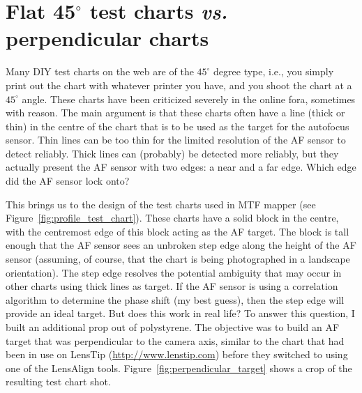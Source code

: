 \documentclass[a4paper]{article}
\begin{document}
\section{Flat 45$^\circ$ test charts \emph{vs.} perpendicular charts}
\label{sec:perpendicular}
Many DIY test charts on the web are of the $45^\circ$ degree type, i.e., you
simply print out the chart with whatever printer you have, and you shoot the
chart at a $45^\circ$ angle. These charts have been criticized severely in
the online fora, sometimes with reason. The main argument is that these
charts often have a line (thick or thin) in the centre of the chart that is
to be used as the target for the autofocus sensor. Thin lines can be too
thin for the limited resolution of the AF sensor to detect reliably. Thick
lines can (probably) be detected more reliably, but they actually present
the AF sensor with two edges: a near and a far edge. Which edge did the AF
sensor lock onto?

This brings us to the design of the test charts used in MTF mapper (see
Figure~\ref{fig:profile_test_chart}). These charts have a solid block in the
centre, with the centremost edge of this block acting as the AF target. The block is
tall enough that the AF sensor sees an unbroken step edge along the height
of the AF sensor (assuming, of course, that the chart is being photographed in a
landscape orientation). The step edge resolves the potential ambiguity that
may occur in other charts using thick lines as target. If the AF sensor is
using a correlation algorithm to determine the phase shift (my best
guess), then the step edge will provide an ideal target. But does this work
in real life? To answer this question, I built an additional prop out of
polystyrene. The objective was to build an AF target that was perpendicular
to the camera axis, similar to the chart that had been in use on LensTip
(\url{http://www.lenstip.com}) before they switched to using one of the
LensAlign tools. Figure~\ref{fig:perpendicular_target} shows a crop of the
resulting test chart shot.
\end{document}
